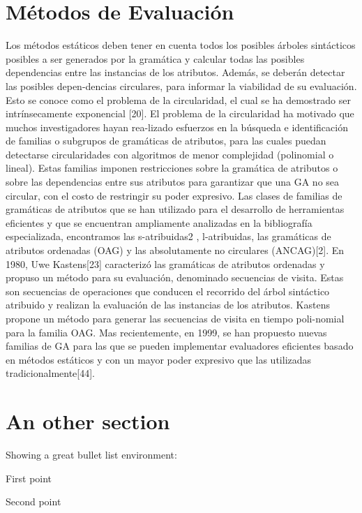 \section{Métodos de Evaluación}

Los métodos estáticos deben tener en cuenta todos los posibles árboles sintácticos posibles a ser generados por la gramática y calcular todas las posibles dependencias entre las instancias de los atributos. Además, se deberán detectar las posibles depen-dencias circulares, para informar la viabilidad de su evaluación.
Esto se conoce como el problema de la circularidad, el cual se ha demostrado ser intrínsecamente exponencial [20]. El problema de la circularidad ha motivado que muchos investigadores hayan rea-lizado esfuerzos en la búsqueda e identificación de familias o subgrupos de gramáticas de atributos, para las cuales puedan detectarse circularidades con algoritmos de menor complejidad (polinomial o lineal).
Estas familias imponen restricciones sobre la gramática de atributos o sobre las dependencias entre sus atributos para garantizar que una GA no sea circular, con el costo de restringir su poder expresivo. 
Las clases de familias de gramáticas de atributos que se han utilizado para el desarrollo de herramientas eficientes y que se encuentran ampliamente analizadas en la bibliografía especializada, encontramos las s-atribuidas2 , l-atribuidas, las gramáticas de atributos ordenadas (OAG) y las absolutamente no circulares (ANCAG)[2]. En 1980, Uwe Kastens[23] caracterizó las gramáticas de atributos ordenadas y propuso un método para su evaluación, denominado secuencias de visita. Estas son secuencias de operaciones que conducen el recorrido del árbol sintáctico atribuido y realizan la evaluación de las instancias de los atributos. Kastens propone un método para generar las secuencias de visita en tiempo poli-nomial para la familia OAG.
Mas recientemente, en 1999, se han propuesto nuevas familias de GA para las que se pueden implementar evaluadores eficientes basado en métodos estáticos y con un mayor poder expresivo que las utilizadas tradicionalmente[44].


% 
% 

\section{An other section}

Showing a great bullet list environment:

\begin{bulletList}
 \item First point
 \item Second point
\end{bulletList}
